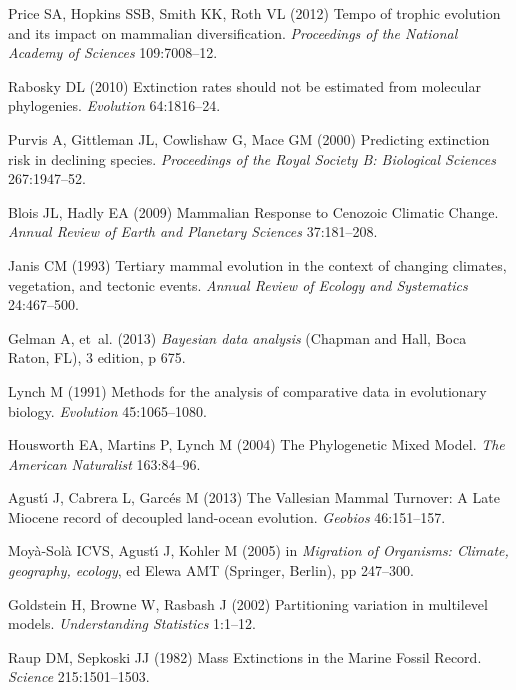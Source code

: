 \documentclass{pnastwo}
\begin{document}
\begin{article}
\begin{thebibliography}{10}
Price SA, Hopkins SSB, Smith KK, Roth VL
\newblock (2012) {Tempo of trophic evolution and its impact on mammalian
  diversification.}
\newblock \emph{Proceedings of the National Academy of Sciences} 109:7008--12.

Rabosky DL
\newblock (2010) {Extinction rates should not be estimated from molecular
  phylogenies}.
\newblock \emph{Evolution} 64:1816--24.

Purvis A, Gittleman JL, Cowlishaw G, Mace GM
\newblock (2000) {Predicting extinction risk in declining species.}
\newblock \emph{Proceedings of the Royal Society B: Biological Sciences}
  267:1947--52.

Blois JL, Hadly EA
\newblock (2009) {Mammalian Response to Cenozoic Climatic Change}.
\newblock \emph{Annual Review of Earth and Planetary Sciences} 37:181--208.

Janis CM
\newblock (1993) {Tertiary mammal evolution in the context of changing
  climates, vegetation, and tectonic events}.
\newblock \emph{Annual Review of Ecology and Systematics} 24:467--500.

Gelman A, {et~al.}
\newblock (2013) \emph{{Bayesian data analysis}}
\newblock (Chapman and Hall, Boca Raton, FL), 3 edition, p 675.

Lynch M
\newblock (1991) {Methods for the analysis of comparative data in evolutionary
  biology}.
\newblock \emph{Evolution} 45:1065--1080.

Housworth EA, Martins P, Lynch M
\newblock (2004) {The Phylogenetic Mixed Model}.
\newblock \emph{The American Naturalist} 163:84--96.

Agust\'{\i} J, Cabrera L, Garc\'{e}s M
\newblock (2013) {The Vallesian Mammal Turnover: A Late Miocene record of
  decoupled land-ocean evolution}.
\newblock \emph{Geobios} 46:151--157.

Moy\`{a}-Sol\`{a} ICVS, Agust\'{\i} J, Kohler M
\newblock (2005) in \emph{Migration of Organisms: Climate, geography, ecology},
  ed{} Elewa AMT
\newblock (Springer, Berlin), pp 247--300.

Goldstein H, Browne W, Rasbash J
\newblock (2002) {Partitioning variation in multilevel models}.
\newblock \emph{Understanding Statistics} 1:1--12.

Raup DM, Sepkoski JJ
\newblock (1982) {Mass Extinctions in the Marine Fossil Record}.
\newblock \emph{Science} 215:1501--1503.


\end{thebibliography}
\end{article}
\end{document}
